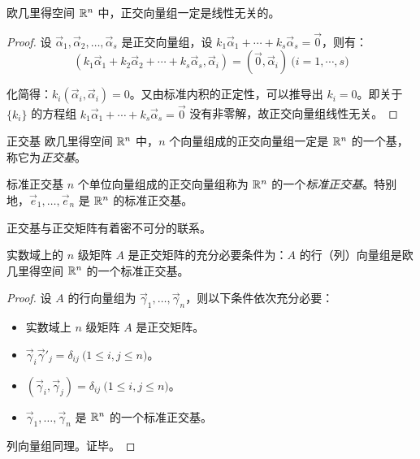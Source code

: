 \begin{theorem}
	欧几里得空间 $\mathbb R^n$ 中，正交向量组一定是线性无关的。
\end{theorem}

\begin{proof}
	设 $\vec \alpha_1, \vec \alpha_2, \ldots, \vec \alpha_s$ 是正交向量组，设 $k_1 \vec \alpha_1 + \cdots + k_s \vec \alpha_s = \vec 0$，则有：
	$$
	(k_1 \vec \alpha_1 + k_2 \vec \alpha_2 + \cdots + k_s \vec \alpha_s, \vec \alpha_i) = (\vec 0, \vec \alpha_i) \pod{i = 1, \cdots, s}
	$$

	化简得：$k_i (\vec \alpha_i, \vec \alpha_i) = 0$。又由标准内积的正定性，可以推导出 $k_i = 0$。即关于 $\{k_i\}$ 的方程组 $k_1 \vec \alpha_1 + \cdots + k_s \vec \alpha_s = \vec 0$ 没有非零解，故正交向量组线性无关。
\end{proof}

\begin{definition}{正交基}
	欧几里得空间 $\mathbb R^n$ 中，$n$ 个向量组成的正交向量组一定是 $\mathbb R^n$ 的一个基，称它为\emph{正交基}。
\end{definition}

\begin{definition}{标准正交基}
	$n$ 个单位向量组成的正交向量组称为 $\mathbb R^n$ 的一个\emph{标准正交基}。特别地，$\vec e_1, \ldots, \vec e_n$ 是 $\mathbb R^n$ 的标准正交基。
\end{definition}

\bigskip

正交基与正交矩阵有着密不可分的联系。

\begin{theorem}
	实数域上的 $n$ 级矩阵 $A$ 是正交矩阵的充分必要条件为：$A$ 的行（列）向量组是欧几里得空间 $\mathbb R^n$ 的一个标准正交基。
\end{theorem}

\begin{proof}
	设 $A$ 的行向量组为 $\vec \gamma_1, \ldots, \vec \gamma_n$，则以下条件依次充分必要：
	\begin{itemize}
		\item 实数域上 $n$ 级矩阵 $A$ 是正交矩阵。
		\item $\vec \gamma_i \vec \gamma'_j = \delta_{ij} \pod{1 \le i, j \le n}$。
		\item $(\vec \gamma_i, \vec \gamma_j) = \delta_{ij} \pod{1 \le i, j \le n}$。
		\item $\vec \gamma_1, \ldots, \vec \gamma_n$ 是 $\mathbb R^n$ 的一个标准正交基。
	\end{itemize}

	列向量组同理。证毕。
\end{proof}

